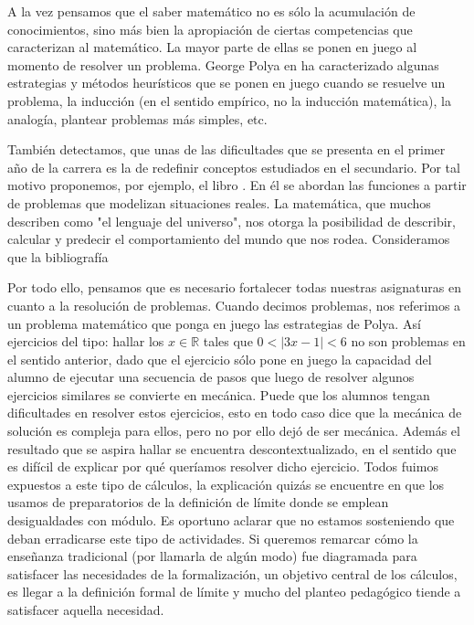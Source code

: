 \documentclass[a4paper,10pt,BCOR10mm,oneside,headsepline]{scrbook}
\begin{document}
A la vez pensamos que el saber matemático no es sólo la acumulación de conocimientos, sino más bien la apropiación de ciertas competencias que caracterizan al matemático. La mayor parte de ellas se ponen en juego al momento de resolver un problema. George Polya en \cite{polya_how,polya_plauI,polya_plauII} ha caracterizado algunas estrategias y métodos heurísticos que se ponen en juego cuando se resuelve un problema, la inducción (en el sentido empírico, no la inducción matemática), la analogía, plantear problemas más simples, etc. 

También detectamos, que unas de las dificultades que se presenta en el primer año de la carrera es la de redefinir conceptos estudiados en el secundario. Por tal motivo proponemos, por ejemplo, el libro \cite{bocco}. En él se abordan las funciones a partir de problemas que modelizan situaciones reales. La matemática, que muchos describen como "el lenguaje del universo", nos otorga
la posibilidad de describir, calcular y predecir el comportamiento del mundo que
nos rodea. Consideramos que la bibliografía 

Por todo ello, pensamos que es necesario fortalecer todas nuestras asignaturas en cuanto a la resolución de problemas. Cuando decimos problemas, nos referimos a un problema matemático que ponga en juego las estrategias de Polya. Así ejercicios del tipo: hallar los $x\in\mathbb{R}$ tales que $0<|3x-1|<6$ no son problemas en el sentido anterior, dado que el ejercicio sólo pone en juego la capacidad del alumno de ejecutar una secuencia de pasos que luego de resolver algunos ejercicios similares se convierte en mecánica. Puede que los alumnos tengan dificultades en resolver estos ejercicios, esto en todo caso dice que la mecánica de solución es compleja para ellos, pero no por ello dejó de ser mecánica. Además el resultado que se aspira hallar se encuentra descontextualizado, en el sentido que es difícil de explicar por qué queríamos resolver dicho ejercicio. Todos fuimos expuestos a este tipo de cálculos, la explicación quizás se encuentre en que los usamos de preparatorios de la definición de límite donde se emplean desigualdades con módulo. Es oportuno aclarar que no estamos sosteniendo que deban erradicarse este tipo de actividades. Si queremos remarcar cómo la enseñanza tradicional (por llamarla de algún  modo) fue diagramada para satisfacer las necesidades de la formalización, un objetivo central de los cálculos, es llegar a la definición formal de límite y mucho del planteo pedagógico tiende a satisfacer aquella necesidad.  
 
\end{document}
